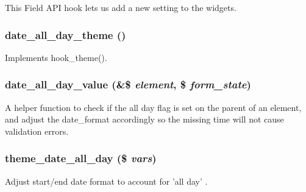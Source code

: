 This Field API hook lets us add a new setting to the widgets. \hypertarget{date__all__day_8module_a7edcfcaf78ee4f273c521bd634b31d7b}{
\subsubsection[{date\_\-all\_\-day\_\-theme}]{\setlength{\rightskip}{0pt plus 5cm}date\_\-all\_\-day\_\-theme ()}}
\label{date__all__day_8module_a7edcfcaf78ee4f273c521bd634b31d7b}
Implements hook\_\-theme(). \hypertarget{date__all__day_8module_a1856ce458f79c00e45a3b662789279ac}{
\subsubsection[{date\_\-all\_\-day\_\-value}]{\setlength{\rightskip}{0pt plus 5cm}date\_\-all\_\-day\_\-value (\&\$ {\em element}, \/  \$ {\em form\_\-state})}}
\label{date__all__day_8module_a1856ce458f79c00e45a3b662789279ac}
A helper function to check if the all day flag is set on the parent of an element, and adjust the date\_\-format accordingly so the missing time will not cause validation errors. \hypertarget{date__all__day_8module_a03048bd6261e056d3ac6f15fb223a0e0}{
\subsubsection[{theme\_\-date\_\-all\_\-day}]{\setlength{\rightskip}{0pt plus 5cm}theme\_\-date\_\-all\_\-day (\$ {\em vars})}}
\label{date__all__day_8module_a03048bd6261e056d3ac6f15fb223a0e0}
Adjust start/end date format to account for 'all day' .


